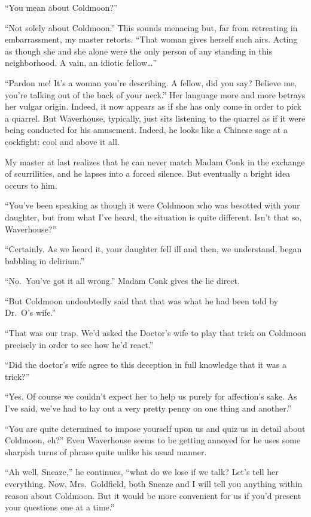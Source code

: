 \documentclass{book}
\begin{document}
``You mean about Coldmoon?''

``Not solely about Coldmoon.'' This sounds menacing but, far from
retreating in embarrassment, my master retorts. ``That woman gives
herself such airs. Acting as though she and she alone were the only
person of any standing in this neighborhood. A vain, an idiotic
fellow\ldots{}''

``Pardon me! It's a woman you're describing. A fellow, did you say?
Believe me, you're talking out of the back of your neck.'' Her language
more and more betrays her vulgar origin. Indeed, it now appears as if
she has only come in order to pick a quarrel. But Waverhouse, typically,
just sits listening to the quarrel as if it were being conducted for his
amusement. Indeed, he looks like a Chinese sage at a cockfight: cool and
above it all.

My master at last realizes that he can never match Madam Conk in the
exchange of scurrilities, and he lapses into a forced silence. But
eventually a bright idea occurs to him.

``You've been speaking as though it were Coldmoon who was besotted with
your daughter, but from what I've heard, the situation is quite
different. Isn't that so, Waverhouse?''

``Certainly. As we heard it, your daughter fell ill and then, we
understand, began babbling in delirium.''

``No.~You've got it all wrong.'' Madam Conk gives the lie direct.

``But Coldmoon undoubtedly said that that was what he had been told by
Dr.~O's wife.''

``That was our trap. We'd asked the Doctor's wife to play that trick on
Coldmoon precisely in order to see how he'd react.''

``Did the doctor's wife agree to this deception in full knowledge that
it was a trick?''

``Yes. Of course we couldn't expect her to help us purely for
affection's sake. As I've said, we've had to lay out a very pretty penny
on one thing and another.''

``You are quite determined to impose yourself upon us and quiz us in
detail about Coldmoon, eh?'' Even Waverhouse seems to be getting annoyed
for he uses some sharpish turns of phrase quite unlike his usual manner.

``Ah well, Sneaze,'' he continues, ``what do we lose if we talk? Let's
tell her everything. Now, Mrs.~Goldfield, both Sneaze and I will tell
you anything within reason about Coldmoon. But it would be more
convenient for us if you'd present your questions one at a time.''
\end{document}
